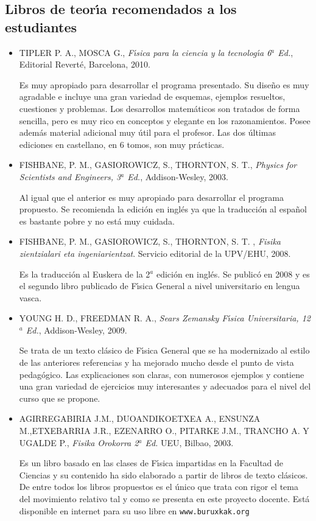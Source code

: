 \subsection{Libros de teor\'{\i}a recomendados a los estudiantes}
\begin{itemize}
\item
 TIPLER P. A.,  MOSCA G.,
{\it F\'{\i}sica para la ciencia y la tecnolog\'{\i}a 6$^a$ Ed.},
Editorial Revert\'{e}, Barcelona, 2010.

Es muy apropiado para desarrollar el programa presentado. Su dise\~{n}o es
 muy agradable e incluye una gran variedad de esquemas, ejemplos resueltos, 
cuestiones y problemas.
 Los desarrollos matem\'{a}ticos son tratados 
de forma sencilla, pero es muy rico en conceptos y elegante en los
 razonamientos. Posee adem\'{a}s  material adicional muy \'{u}til para el profesor. Las dos \'{u}ltimas ediciones en castellano, en 6 tomos,
 son muy pr\'{a}cticas.

\item 
FISHBANE, P. M., GASIOROWICZ, S., THORNTON, S. T.,
{\it Physics for Scientists and Engineers, 3$^a$ Ed.},
Addison-Wesley, 2003.

Al igual que el anterior es muy apropiado para desarrollar el programa 
propuesto. Se recomienda
la edici\'{o}n en ingl\'{e}s ya que la traducci\'{o}n al espa\~{n}ol es bastante pobre y 
no est\'{a} muy cuidada.

\item   
 FISHBANE, P. M., GASIOROWICZ, S., THORNTON, S. T. ,
{\it Fisika zientzialari eta ingeniarientzat}. Servicio editorial de la 
UPV/EHU, 2008.

Es la traducci\'{o}n al Euskera de la 2$^a$ edici\'{o}n en ingl\'{e}s. 
Se public\'{o} en 2008 y es el 
segundo libro publicado de F\'{\i}sica General a nivel universitario en lengua vasca.

\item 
YOUNG H. D.,  FREEDMAN R. A., 
{\it Sears  Zemansky F\'{\i}sica Universitaria,  12$^a$ Ed.},
Addison-Wesley, 2009.

Se trata de un texto cl\'{a}sico de F\'{\i}sica General que se ha modernizado al estilo 
de las anteriores referencias y ha mejorado mucho desde el punto de vista pedag\'{o}gico.
Las explicaciones son claras, con numerosos ejemplos y  contiene una 
gran variedad de ejercicios muy interesantes y adecuados para el nivel del curso que se propone.

\item
AGIRREGABIRIA J.M., DUOANDIKOETXEA A., ENSUNZA M.,ETXEBARRIA J.R., EZENARRO O., PITARKE J.M., TRANCHO A. Y UGALDE P., 
{\it  Fisika Orokorra 2$^a$ Ed.} UEU, Bilbao, 2003.

Es un libro basado en  las clases de F\'{\i}sica impartidas en la Facultad de Ciencias y su contenido ha sido elaborado a partir de libros de texto cl\'{a}sicos. De entre
todos los libros propuestos es el \'{u}nico que trata con rigor el tema del 
movimiento relativo tal y como se presenta en este proyecto docente.
Est\'a disponible en internet para su uso libre en 
 {\tt  www.buruxkak.org}

\end{itemize}

